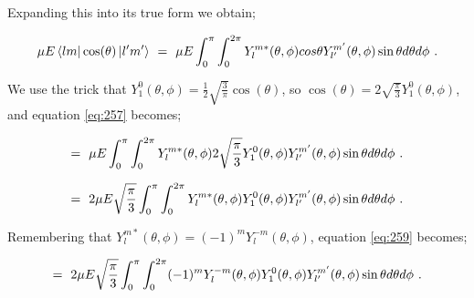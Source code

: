 \documentclass{article}
\begin{document}
Expanding this into its true form we obtain; 

\begin{equation} \label{eq:261}
\mu E\bra{l m}\cos(\theta)\ket{l' m'} \hspace{0.125cm} = \hspace{0.125cm} \mu E \int_{0}^{\pi} \int_{0}^{2\pi} Y_{l}^{m \ast}(\theta, \phi) cos\theta Y_{l'}^{m'}(\theta, \phi) \sin\theta d\theta d\phi \hspace{0.125cm} . 
\end{equation}

We use the trick that \begin{math} Y_{1}^{0}(\theta, \phi)  = \frac{1}{2}\sqrt{\frac{3}{\pi}}\cos(\theta) \end{math}, so \begin{math} \cos(\theta) = {2}\sqrt{\frac{\pi}{3}} Y_{1}^{0}(\theta, \phi)  \end{math}, and equation \ref{eq:257} becomes; 

\begin{equation} \label{eq:262}
= \hspace{0.125cm} \mu E \int_{0}^{\pi} \int_{0}^{2\pi} Y_{l}^{m \ast}(\theta, \phi) {2}\sqrt{\frac{\pi}{3}} Y_{1}^{0}(\theta, \phi) Y_{l'}^{m'}(\theta, \phi) \sin\theta d\theta d\phi \hspace{0.125cm} . 
\end{equation}

\begin{equation} \label{eq:263}
= \hspace{0.125cm} 2 \mu E \sqrt{\frac{\pi}{3}} \int_{0}^{\pi} \int_{0}^{2\pi} Y_{l}^{m \ast}(\theta, \phi) Y_{1}^{0}(\theta, \phi) Y_{l'}^{m'}(\theta, \phi) \sin\theta d\theta d\phi \hspace{0.125cm} . 
\end{equation}

Remembering that \begin{math} Y_{l}^{m \ast}(\theta, \phi)  =  (-1)^{m} Y_{l}^{-m}(\theta, \phi)  \end{math}, equation \ref{eq:259} becomes;

\begin{equation} \label{eq:264}
= \hspace{0.125cm} 2 \mu E \sqrt{\frac{\pi}{3}} \int_{0}^{\pi} \int_{0}^{2\pi} (-1)^{m} Y_{l}^{-m}(\theta, \phi) Y_{1}^{0}(\theta, \phi) Y_{l'}^{m'}(\theta, \phi) \sin\theta d\theta d\phi \hspace{0.125cm} . 
\end{equation}
\end{document}
